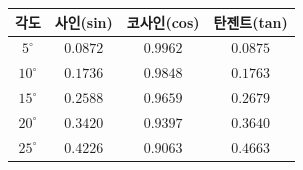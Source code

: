 {\renewcommand{\arraystretch}{1.45}\small
\begin{tabular}{|c|c|c|c|}
\hline
각도 & 사인(sin) & 코사인(cos) & 탄젠트(tan) \\ \hline
$5^\circ$ & $0.0872$ & $0.9962$ & $0.0875$ \\ \hline
$10^\circ$ & $0.1736$ & $0.9848$ & $0.1763$ \\ \hline
$15^\circ$ & $0.2588$ & $0.9659$ & $0.2679$ \\ \hline
$20^\circ$ & $0.3420$ & $0.9397$ & $0.3640$ \\ \hline
$25^\circ$ & $0.4226$ & $0.9063$ & $0.4663$ \\ \hline
\end{tabular}}
